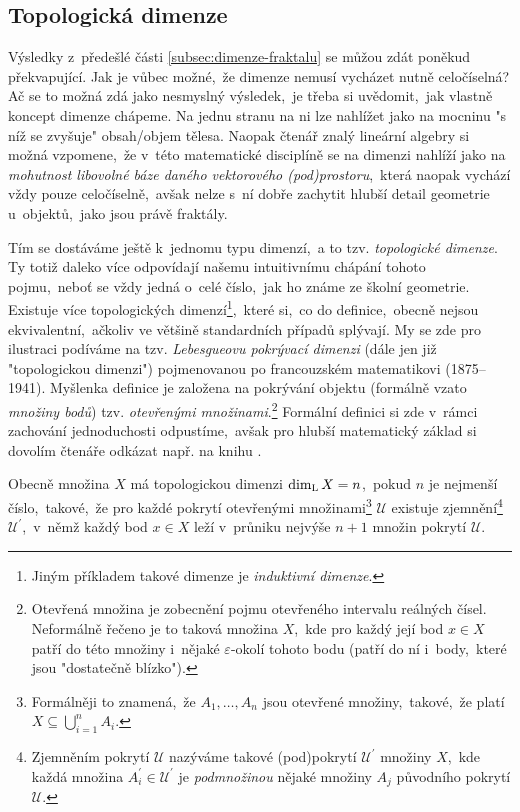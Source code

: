 \subsection{Topologická dimenze}\label{subsec:topologicka-dimenze}

Výsledky z~předešlé části \ref{subsec:dimenze-fraktalu} se můžou zdát poněkud překvapující. Jak je vůbec možné,~že dimenze nemusí vycházet nutně celočíselná? Ač se to možná zdá jako nesmyslný výsledek,~je třeba si uvědomit,~jak vlastně koncept dimenze chápeme. Na jednu stranu na ni lze nahlížet jako na mocninu "s níž se zvyšuje" obsah/objem tělesa. Naopak čtenář znalý lineární algebry si možná vzpomene,~že v~této matematické disciplíně se na dimenzi nahlíží jako na \emph{mohutnost libovolné báze daného vektorového (pod)prostoru},~která naopak vychází vždy pouze celočíselně,~avšak nelze s~ní dobře zachytit hlubší detail geometrie u~objektů,~jako jsou právě fraktály.

Tím se dostáváme ještě k~jednomu typu dimenzí,~a to tzv. \emph{topologické dimenze}. Ty totiž daleko více odpovídají našemu intuitivnímu chápání tohoto pojmu,~neboť se vždy jedná o~celé číslo,~jak ho známe ze školní geometrie. Existuje více topologických dimenzí\footnote{Jiným příkladem takové dimenze je \emph{induktivní dimenze}.},~které si,~co do definice,~obecně nejsou ekvivalentní,~ačkoliv ve většině standardních případů splývají. My se zde pro ilustraci podíváme na tzv. \emph{Lebesgueovu pokrývací dimenzi} (dále jen již "topologickou dimenzi") pojmenovanou po francouzském matematikovi  (1875--1941). Myšlenka definice je založena na pokrývání objektu (formálně vzato \emph{množiny bodů}) tzv. \emph{otevřenými množinami}.\footnote{Otevřená množina je zobecnění pojmu otevřeného intervalu reálných čísel. Neformálně řečeno je to taková množina $X$,~kde pro každý její bod $x\in X$ patří do této množiny i~nějaké $\varepsilon$-okolí tohoto bodu (patří do ní i~body,~které jsou "dostatečně blízko").} Formální definici si zde v~rámci zachování jednoduchosti odpustíme,~avšak pro hlubší matematický základ si dovolím čtenáře odkázat např. na knihu \cite{Engelking1989}.

Obecně množina $X$ má topologickou dimenzi $\operatorname{dim_L}{X}=n$,~pokud $n$ je nejmenší číslo,~takové,~že pro každé pokrytí otevřenými množinami\footnote{Formálněji to znamená,~že $A_1,\dots,A_n$ jsou otevřené množiny,~takové,~že platí $X\subseteq\bigcup_{i=1}^n{A_i}$.} $\mathcal{U}$ existuje zjemnění\footnote{Zjemněním pokrytí $\mathcal{U}$ nazýváme takové (pod)pokrytí $\mathcal{U}^\prime$ množiny $X$,~kde každá množina $A_i^\prime\in\mathcal{U}^\prime$ je \emph{podmnožinou} nějaké množiny $A_j$ původního pokrytí $\mathcal{U}$.} $\mathcal{U}^\prime$,~v~němž každý bod $x\in X$ leží v~průniku nejvýše $n+1$ množin pokrytí $\mathcal{U}$.

